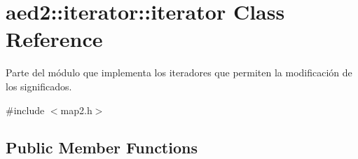 \hypertarget{classaed2_1_1iterator_1_1iterator}{\section{aed2\-:\-:iterator\-:\-:iterator \-Class \-Reference}
\label{classaed2_1_1iterator_1_1iterator}
}


\-Parte del módulo que implementa los iteradores que permiten la modificación de los significados.  




{\ttfamily \#include $<$map2.\-h$>$}

\subsection*{\-Public \-Member \-Functions}
